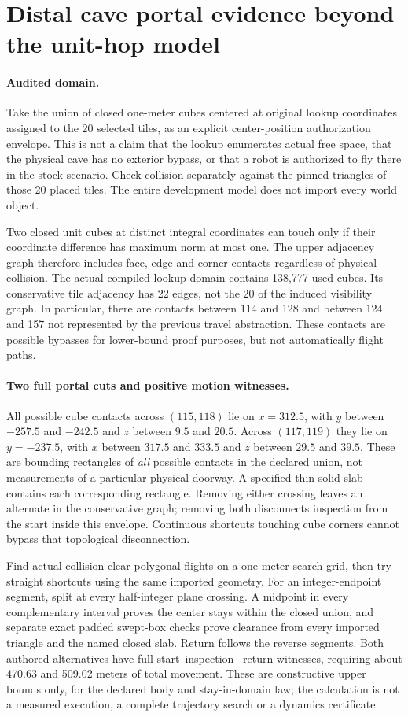\documentclass{article}
\begin{document}
\section*{Distal cave portal evidence beyond the unit-hop model}
\paragraph{Audited domain.}
Take the union of closed one-meter cubes centered at original
lookup coordinates assigned to the 20 selected tiles, as an
explicit center-position authorization envelope. This is not a
claim that the lookup enumerates actual free space, that the
physical cave has no exterior bypass, or that a robot is
authorized to fly there in the stock scenario. Check collision
separately against the pinned triangles of those 20 placed tiles.
The entire development model does not import every world object.

Two closed unit cubes at distinct integral coordinates can touch
only if their coordinate difference has maximum norm at most
one. The upper adjacency graph therefore includes face, edge
and corner contacts regardless of physical collision. The actual
compiled lookup domain contains 138,777 used cubes. Its conservative
tile adjacency has 22 edges, not the 20 of the induced visibility
graph. In particular, there are contacts between 114 and 128 and
between 124 and 157 not represented by the previous travel
abstraction. These contacts are possible bypasses for lower-bound
proof purposes, but not automatically flight paths.

\paragraph{Two full portal cuts and positive motion witnesses.}
All possible cube contacts across $(115,118)$ lie on $x=312.5$,
with $y$ between $-257.5$ and $-242.5$ and $z$ between
$9.5$ and $20.5$. Across $(117,119)$ they lie on $y=-237.5$,
with $x$ between $317.5$ and $333.5$ and $z$ between
$29.5$ and $39.5$. These are bounding rectangles of \emph{all}
possible contacts in the declared union, not measurements of a
particular physical doorway. A specified thin solid slab contains
each corresponding rectangle. Removing either crossing leaves
an alternate in the conservative graph; removing both
disconnects inspection from the start inside this envelope.
Continuous shortcuts touching cube corners cannot bypass that
topological disconnection.

Find actual collision-clear polygonal flights on a one-meter search
grid, then try straight shortcuts using the same imported geometry.
For an integer-endpoint segment, split at every half-integer
plane crossing. A midpoint in every complementary interval
proves the center stays within the closed union, and separate
exact padded swept-box checks prove clearance from every imported
triangle and the named closed slab. Return follows the reverse
segments. Both authored alternatives have full start--inspection--
return witnesses, requiring about 470.63 and 509.02 meters of
total movement. These are constructive upper bounds only, for
the declared body and stay-in-domain law; the calculation is not
a measured execution, a complete trajectory search or a dynamics
certificate.
\end{document}
